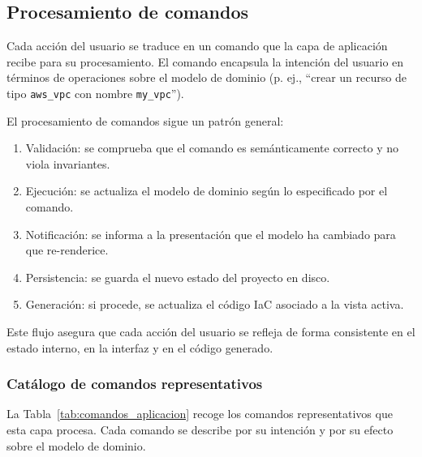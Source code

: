 \documentclass{article}
\begin{document}
{        \subsection{Procesamiento de comandos}
        \justify
        Cada acción del usuario se traduce en un comando que la capa de aplicación
        recibe para su procesamiento. El comando encapsula la intención del usuario en
        términos de operaciones sobre el modelo de dominio (p. ej., ``crear un recurso
        de tipo \texttt{aws\_vpc} con nombre \texttt{my\_vpc}'').

        \justify
        El procesamiento de comandos sigue un patrón general:
        \begin{enumerate}
            \item Validación: se comprueba que el comando es semánticamente correcto y no viola invariantes.
            \item Ejecución: se actualiza el modelo de dominio según lo especificado por el comando.
            \item Notificación: se informa a la presentación que el modelo ha cambiado para que re-renderice.
            \item Persistencia: se guarda el nuevo estado del proyecto en disco.
            \item Generación: si procede, se actualiza el código IaC asociado a la vista activa.
        \end{enumerate}

        \justify
        Este flujo asegura que cada acción del usuario se refleja de forma consistente
        en el estado interno, en la interfaz y en el código generado.

        \subsubsection*{Catálogo de comandos representativos}
        \justify
        La Tabla~\ref{tab:comandos_aplicacion} recoge los comandos
        representativos que esta capa procesa. Cada comando se describe por su
        intención y por su efecto sobre el modelo de dominio.

}
\end{document}
